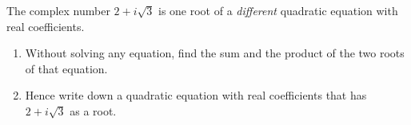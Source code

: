 \documentclass[12pt, twoside]{article}
\begin{document}
\begin{enumerate}[itemsep=0.15cm]
The complex number $2 + i\sqrt{3}$ is one root of a \emph{different}
quadratic equation with real coefficients.

\begin{enumerate}[itemsep=0.15cm]
  \item[(c)] Without solving any equation, find the sum and the product of
  the two roots of that equation.
  \item[(d)] Hence write down a quadratic equation with real coefficients
  that has $2 + i\sqrt{3}$ as a root.
\end{enumerate}


\end{enumerate}
\end{document}
